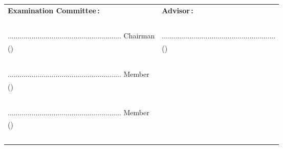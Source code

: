 \begin{ApprovalPage}
\begin{tabularx}{\textwidth}{@{}Xl@{}}
	\textbf{Examination Committee\,:}	&\textbf{Advisor\,:}\\~\\
	......................................................... Chairman	&......................................................... \\
	(\printChairman)											&(\printAdvisor)\\~\\
	......................................................... Member\\		
	(\printCommitteeB)\\~\\
	......................................................... Member\\
	(\printCommitteeA)\\~\\
\end{tabularx}\vspace{66pt}
\end{ApprovalPage}
